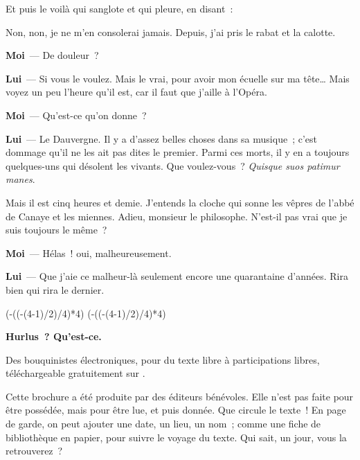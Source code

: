 \documentclass[french,twoside]{book} %
\newcommand{\labelchar}[1]{\textbf{\color{rubric} #1}}
\def\truncdiv#1#2{((#1-(#2-1)/2)/#2)}
\def\moduloop#1#2{(#1-\truncdiv{#1}{#2}*#2)}
\def\modulo#1#2{\number\numexpr\moduloop{#1}{#2}\relax}
\begin{document}
Et puis le voilà qui sanglote et qui pleure, en disant :\par
Non, non, je ne m’en consolerai jamais. Depuis, j’ai pris le rabat et la calotte.\par
\labelchar{Moi} — De douleur ?\par
\labelchar{Lui} — Si vous le voulez. Mais le vrai, pour avoir mon écuelle sur ma tête… Mais voyez un peu l’heure qu’il est, car il faut que j’aille à l’Opéra.\par
\labelchar{Moi} — Qu’est-ce qu’on donne ?\par
\labelchar{Lui} — Le Dauvergne. Il y a d’assez belles choses dans sa musique ; c’est dommage qu’il ne les ait pas dites le premier. Parmi ces morts, il y en a toujours quelques-uns qui désolent les vivants. Que voulez-vous ? \emph{Quisque suos patimur manes}.\par
Mais il est cinq heures et demie. J’entends la cloche qui sonne les vêpres de l’abbé de Canaye et les miennes. Adieu, monsieur le philosophe. N’est-il pas vrai que je suis toujours le même ?\par
\labelchar{Moi} — Hélas ! oui, malheureusement.\par
\labelchar{Lui} — Que j’aie ce malheur-là seulement encore une quarantaine d’années. Rira bien qui rira le dernier.
 


\ifbooklet
  \pagestyle{empty}
  \clearpage
  \ifnum\modulo{\value{page}}{4}=0 \hbox{}\newpage\hbox{}\newpage\fi
  \ifnum\modulo{\value{page}}{4}=1 \hbox{}\newpage\hbox{}\newpage\fi


  \hbox{}\newpage
  \ifodd\value{page}\hbox{}\newpage\fi
  {\centering\color{rubric}\bfseries\noindent\large
    Hurlus ? Qu’est-ce.\par
    \bigskip
  }
  \noindent Des bouquinistes électroniques, pour du texte libre à participations libres,
  téléchargeable gratuitement sur \href{https://hurlus.fr}{}.\par
  \bigskip
  \noindent Cette brochure a été produite par des éditeurs bénévoles.
  Elle n’est pas faite pour être possédée, mais pour être lue, et puis donnée.
  Que circule le texte !
  En page de garde, on peut ajouter une date, un lieu, un nom ;
  comme une fiche de bibliothèque en papier,
  pour suivre le voyage du texte. Qui sait, un jour, vous la retrouverez ?
  \par
\end{document}
